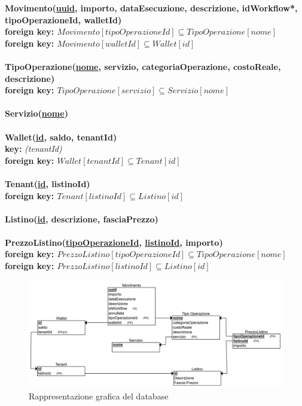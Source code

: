 \textbf{Movimento(\underline{uuid}, importo, dataEsecuzione, descrizione, idWorkflow*,\\ tipoOperazioneId, walletId) \\}
\textbf{\hspace*{1.5 cm} foreign key: $ Movimento[tipoOperazioneId] \subseteq TipoOperazione[nome] $} \\
\textbf{\hspace*{1.5 cm} foreign key: $ Movimento[walletId] \subseteq Wallet[id] $ }
\\\\
\textbf{TipoOperazione(\underline{nome}, servizio, categoriaOperazione, costoReale, \\descrizione) \\}
\textbf{\hspace*{1.5 cm} foreign key: $ TipoOperazione[servizio] \subseteq Servizio[nome] $}
\\\\
\textbf{Servizio(\underline{nome})}
\\\\
\textbf{Wallet(\underline{id}, saldo, tenantId) \\}
\textbf{\hspace*{1.5 cm} key:} \textit{(tenantId)} \\
\textbf{\hspace*{1.5 cm} foreign key: $ Wallet[tenantId] \subseteq Tenant[id] $}
\\\\
\textbf{Tenant(\underline{id}, listinoId) \\}
\textbf{\hspace*{1.5 cm} foreign key: $ Tenant[listinoId] \subseteq Listino[id] $}
\\\\
\textbf{Listino(\underline{id}, descrizione, fasciaPrezzo)}
\\\\
\textbf{PrezzoListino(\underline{tipoOperazioneId}, \underline{listinoId}, importo) \\}
\textbf{\hspace*{1.5 cm} foreign key: $ PrezzoListino[tipoOperazioneId] \subseteq TipoOperazione[nome] $} \\
\textbf{\hspace*{1.5 cm} foreign key: $ PrezzoListino[listinoId] \subseteq Listino[id] $}

\begin{figure}[H]
  \centering
  \includegraphics[width=13cm]{images/db-diagrams/rappresentazione-grafica-db.png}
  \caption{Rappresentazione grafica del database}
\end{figure}

